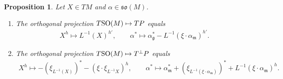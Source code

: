 \documentclass[pdftex]{sigma}
\numberwithin{equation}{section}
\newtheorem{Proposition}[Theorem]{Proposition}
\begin{document}
\begin{Proposition}\label{prop:ProjtoTP}
Let $X\in TM$ and $\alpha\in\mathfrak{so}(M)$.
\begin{enumerate}\itemsep=0pt
\item[$1.$] The orthogonal projection $T{\rm SO}(M)\mapsto TP$ equals
\begin{gather*}
X^h\mapsto L^{-1}(X)^{h'},\qquad
\alpha^{\ast}\mapsto \alpha_{\mathfrak{g}}^{\ast}-L^{-1}(\xi\cdot\alpha_{\mathfrak{m}})^{h'}.
\end{gather*}
\item[$2.$] The orthogonal projection $T{\rm SO}(M)\mapsto T^{\bot}P$ equals
\begin{gather*}
X^h\mapsto -(\xi_{L^{-1}(X)})^{\ast}-(\xi\cdot\xi_{L^{-1}X})^h,
\qquad
\alpha^{\ast}\mapsto \alpha_{\mathfrak{m}}^{\ast}
+(\xi_{L^{-1}(\xi\cdot\alpha_{\mathfrak{m}})})^{\ast}
+L^{-1}(\xi\cdot\alpha_{\mathfrak{m}})^h.
\end{gather*}
\end{enumerate}
\end{Proposition}
\end{document}
